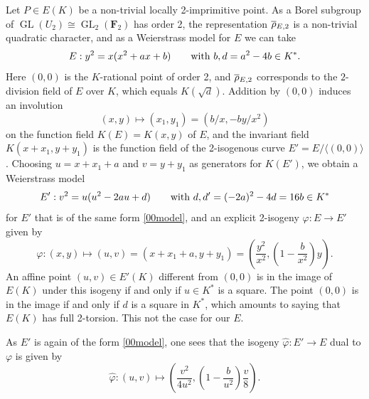 \documentclass{amsart}
\theoremstyle{plain}
\theoremstyle{definition}
\DeclareMathOperator{\GL}{GL}
\newcommand{\FF}{{\mathbf{F}}}
\newcommand{\mybar}[1]{
  \mathchoice
  {#1\llap{$\overline{\phantom{\displaystyle\rm#1}}$}}
  {#1\llap{$\overline{\phantom{\textstyle\rm#1}}$}}
  {#1\llap{$\overline{\phantom{\scriptstyle\rm#1}}$}}
  {#1\llap{$\overline{\phantom{\scriptscriptstyle\rm#1}}$}}
}
\renewcommand{\bar}{\mybar}
\begin{document}
Let $P\in E(K)$ be a non-trivial locally 2-imprimitive point.
As a Borel subgroup of $\GL(U_2)\cong \GL_2(\FF_2)$ has order 2, 
the representation $\bar\rho_{E, 2}$ is a non-trivial quadratic character,
and as a Weierstrass model for $E$ we can take 
\begin{equation}
\label{00model}
E: y^2=x(x^2+ax+b) \qquad \hbox{with } b, d=a^2-4b\in K^* .
\end{equation}
Here $(0,0)$ is the $K$-rational point of order 2, and $\bar \rho_{E, 2}$ 
corresponds to the $2$-division field of $E$ over $K$, which equals $K(\sqrt d)$.
Addition by $(0,0)$ induces an involution 
\[
(x,y)\mapsto (x_1, y_1)=(b/x, -by/x^2)
\]
on the function field $K(E)=K(x,y)$ of $E$, and the invariant field 
$K(x+x_1, y+y_1)$ is the function field of the
2-isogenous curve $E'=E/\langle(0,0)\rangle$.
Choosing $u=x+x_1+a$ and $v=y+y_1$ as generators for $K(E')$, 
we obtain a Weierstrass model
\begin{equation}
\label{Eprime}
E': v^2=u(u^2-2au+d)  \qquad \hbox{with } d, d'=(-2a)^2-4d=16b\in K^*
\end{equation}
for $E'$ that is of the same form \eqref{00model}, 
and an explicit 2-isogeny $\varphi: E\to E'$ given by
\begin{equation}
\label{2-isogeny}
\varphi: (x,y)\longmapsto (u, v) = (x+x_1+a, y+y_1)=
\left( \frac {y^2}{x^2}, (1-\frac{b}{x^2})y \right) .
\end{equation}
An affine point $(u,v)\in E'(K)$ different from $(0,0)$ is in the image of $E(K)$ under this isogeny 
if and only if $u\in K^*$ is a square.
The point $(0,0)$ is in the image if and only if $d$ is a square in $K^*$, 
which amounts to saying that $E(K)$ has full 2-torsion.
This not the case for our $E$. 

As $E'$ is again of the form \eqref{00model}, 
one sees that the isogeny $\widehat\varphi: E'\to E$ dual to $\varphi$ is given by
\begin{equation}
\label{dual-2-isogeny}
\widehat\varphi: (u,v)\longmapsto
\left( \frac {v^2}{4u^2}, (1-\frac{b}{u^2})\frac{v}{8} \right) .
\end{equation}
\end{document}
